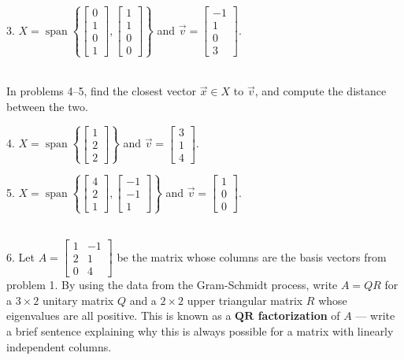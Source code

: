 \documentclass{article}
\begin{document}
3. $X = \operatorname{span}\left\{ \left[\begin{array}{c} 0 \\ 1 \\ 0 \\ 1 \end{array}\right], \left[\begin{array}{c} 1 \\ 1 \\ 0 \\ 0 \end{array}\right]\right\}$ and $\vec{v} = \left[\begin{array}{c} -1 \\ 1 \\ 0 \\ 3 \end{array}\right]$.

~\\

In problems 4--5, find the closest vector $\vec{x} \in X$ to $\vec{v}$, and compute the distance between the two.

4. $X = \operatorname{span}\left\{ \left[\begin{array}{c} 1 \\ 2 \\ 2 \end{array}\right] \right\}$ and $\vec{v} = \left[\begin{array}{c} 3 \\ 1 \\ 4 \end{array}\right]$.

5. $X = \operatorname{span}\left\{ \left[\begin{array}{c} 4 \\ 2 \\ 1 \end{array}\right], \left[\begin{array}{c} -1 \\ -1 \\ 1 \end{array}\right] \right\}$ and $\vec{v} = \left[\begin{array}{c} 1 \\ 0 \\ 0 \end{array}\right]$.

~\\

6. Let $A = \left[\begin{array}{cc} 1& -1 \\ 2& 1 \\ 0& 4 \end{array}\right]$ be the matrix whose columns are the basis vectors from problem 1. By using the data from the Gram-Schmidt process, write $A = QR$ for a $3 \times 2$ unitary matrix $Q$ and a $2 \times 2$ upper triangular matrix $R$ whose eigenvalues are all positive. This is known as a \textbf{$\mathbf{QR}$ factorization} of $A$ --- write a brief sentence explaining why this is always possible for a matrix with linearly independent columns.
\end{document}
